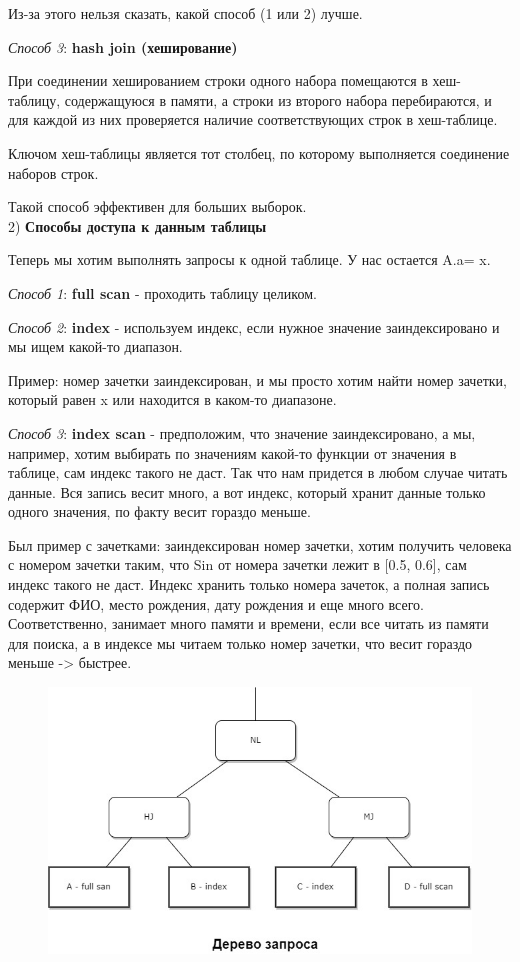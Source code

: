 Из-за этого нельзя сказать, какой способ (1 или 2) лучше. 

\textit{Способ 3}: \textbf{hash join (хеширование)}

При соединении хешированием строки одного набора помещаются в
хеш-таблицу, содержащуюся в памяти, а строки из второго набора
перебираются, и для каждой из них проверяется наличие
соответствующих строк в хеш-таблице.

Ключом хеш-таблицы является тот столбец, по которому выполняется
соединение наборов строк.

Такой способ эффективен для больших выборок. 
\\[15pt]
2) \textbf{Способы доступа к данным таблицы}

Теперь мы хотим выполнять запросы к одной таблице. У нас остается A.a= x. 

\textit{Способ 1}: \textbf{full scan} - проходить таблицу целиком. 

\textit{Способ 2}: \textbf{index} - используем индекс, если нужное значение заиндексировано и мы ищем какой-то диапазон. 

Пример: номер зачетки заиндексирован, и мы просто хотим найти номер зачетки, который равен x или находится в каком-то диапазоне. 

\textit{Способ 3}: \textbf{index scan} - предположим, что значение заиндексировано, а мы, например, хотим выбирать по значениям какой-то функции от значения в таблице, сам индекс такого не даст. Так что нам придется в любом случае читать данные. Вся запись весит много, а вот индекс, который хранит данные только одного значения, по факту весит гораздо меньше. 

Был пример с зачетками: заиндексирован номер зачетки, хотим получить человека с номером зачетки таким, что Sin от номера зачетки лежит в [0.5, 0.6], сам индекс такого не даст. Индекс хранить только номера зачеток, а полная запись содержит ФИО, место рождения, дату рождения и еще много всего. Соответственно, занимает много памяти и времени, если все читать из памяти для поиска, а в индексе мы читаем только номер зачетки, что весит гораздо меньше -> быстрее. 

\begin{figure}[H]
	\centering
	\includegraphics[scale = 0.5]{5/plan.jpg}
	\caption{}
	\label{fig:plan1}
\end{figure}

